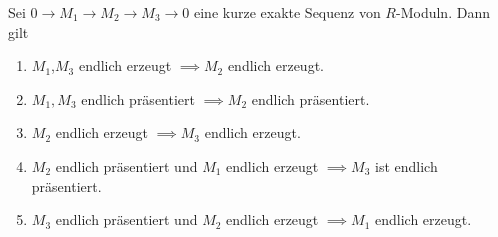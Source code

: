 \begin{Lemma}\label{Lem:ExSeqEndlPrä}
    Sei \(0\to M_1\to M_2\to M_3\to 0\) eine kurze exakte Sequenz von \(R\)-Moduln. Dann gilt
    \begin{enumerate}
        \item \(M_1\),\(M_3\) endlich erzeugt \(\implies M_2\) endlich erzeugt.
        \item \(M_1,M_3\) endlich präsentiert \(\implies M_2\) endlich präsentiert.
        \item \(M_2\) endlich erzeugt \(\implies M_3\) endlich erzeugt.
        \item \(M_2\) endlich präsentiert und \(M_1\) endlich erzeugt \(\implies M_3\) ist endlich präsentiert.
        \item \(M_3\) endlich präsentiert und \(M_2\) endlich erzeugt \(\implies M_1\) endlich erzeugt.
     \end{enumerate}
\end{Lemma}
